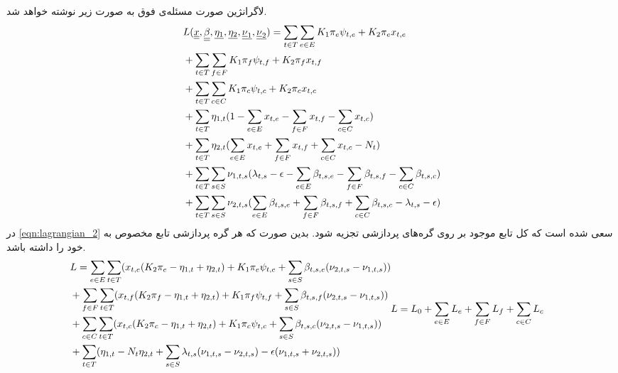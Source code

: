 		لاگرانژین صورت مسئله‌ی فوق به صورت زیر نوشته خواهد شد.
		\begin{align}\label{eqn:lagrangian_1}
			&L(\underline{\underline x}, \underline{\underline \beta}, \underline {\eta_1}, \underline {\eta_2}, \underline{\underline \nu_1}, \underline{\underline \nu_2}) = \sum_{t \in T}\sum_{e \in E} K_1\pi_e\psi_{t,e}+K_2\pi_ex_{t,e} \notag \\
			&+ \sum_{t \in T}\sum_{f \in F} K_1\pi_f\psi_{t,f}+K_2\pi_fx_{t,f} \notag \\
			&+ \sum_{t \in T}\sum_{c \in C} K_1\pi_c\psi_{t,c}+K_2\pi_cx_{t,c} \notag \\
			&+ \sum_{t \in T  }{\eta_{1,t}(1-\sum_{e \in E}x_{t,e} - \sum_{f \in F}x_{t,f} - \sum_{c \in C}x_{t,c})} \notag \\
			&+ \sum_{t \in T}{\eta_{2,t}(\sum_{e \in E}x_{t,e} + \sum_{f \in F}x_{t,f} + \sum_{c \in C}x_{t,c}-N_t)} \notag \\
			&+ \sum_{t \in T}\sum_{s \in S}{\nu_{1,t,s}(\lambda_{t,s} - \epsilon - \sum_{e \in E}\beta_{t,s,e} - \sum_{f \in F}\beta_{t,s,f} - \sum_{c \in C}\beta_{t,s,c})} \notag \\
			&+ \sum_{t \in T}\sum_{s \in S}{\nu_{2,t,s}(\sum_{e \in E}\beta_{t,s,e} + \sum_{f \in F}\beta_{t,s,f} + \sum_{c \in C}\beta_{t,s,c} -\lambda_{t,s} - \epsilon)}
 		\end{align}
	در \cref{eqn:lagrangian_2} سعی شده است که کل تابع موجود بر روی گره‌های پردازشی تجزیه شود. بدین صورت که هر گره پردازشی تابع مخصوص به خود را داشته باشد.
	\begin{subequations}\label{eqn:lagrangian_2}
		\begin{align}
			&L = \sum_{e \in E}\sum_{t \in T}(x_{t,e}(K_2\pi_e-\eta_{1,t}+\eta_{2,t}) + K_1\pi_e\psi_{t,e} + \sum_{s \in S}\beta_{t,s,e}(\nu_{2,t,s} - \nu_{1,t,s})) \notag \\
			&+ \sum_{f \in F}\sum_{t \in T}(x_{t,f}(K_2\pi_f-\eta_{1,t}+\eta_{2,t}) + K_1\pi_f\psi_{t,f} + \sum_{s \in S}\beta_{t,s,f}(\nu_{2,t,s}-\nu_{1,t,s})) \notag \\
			&+ \sum_{c \in C}\sum_{t \in T}(x_{t,c}(K_2\pi_c-\eta_{1,t}+\eta_{2,t}) + K_1\pi_c\psi_{t,c} + \sum_{s \in S}\beta_{t,s,c}(\nu_{2,t,s}-\nu_{1,t,s})) \notag \\
			&+\sum_{t \in T}(\eta_{1,t} - N_t\eta_{2,t} + \sum_{s \in S}\lambda_{t,s}(\nu_{1,t,s}-\nu_{2,t,s}) -\epsilon(\nu_{1,t,s}+\nu_{2,t,s}))
		\end{align}
		\begin{align}
			&L = L_0 + \sum_{e \in E}L_e + \sum_{f \in F}L_f + \sum_{c \in C}L_c
		\end{align}
	\end{subequations}
